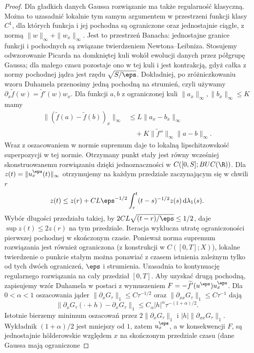\begin{proof}
Dla gładkich danych Gaussa rozwiązanie ma także
regularność klasyczną. Można to uzasadnić lokalnie
tym samym argumentem w przestrzeni funkcji klasy
$C^1$, dla których funkcja i jej pochodna są
ograniczone oraz jednostajnie ciągłe, z normą
$\|w\|_\infty+\|w_x\|_\infty$. Jest to przestrzeń
Banacha: jednostajne granice funkcji i pochodnych
są związane twierdzeniem Newtona--Leibniza.
Stosujemy odwzorowanie Picarda na domkniętej kuli
wokół ewolucji danych przez półgrupę Gaussa;
dla małego czasu pozostaje ono w tej kuli i jest
kontrakcją, gdyż całka z normy pochodnej jądra
jest rzędu $\sqrt{S/\eps}$. Dokładniej, po zróżniczkowaniu wzoru Duhamela
przenosimy jedną pochodną na strumień, czyli używamy
$\partial_x\widetilde f(w)=\widetilde f'(w)w_x$.
Dla funkcji $a,b$ z ograniczonej kuli
$\|a_x\|_\infty,\|b_x\|_\infty\le K$ mamy
\[
 \begin{aligned}
 \|(\widetilde f(a)-\widetilde f(b))_x\|_\infty
 &\le L\|a_x-b_x\|_\infty\\
 &\quad+K\|\widetilde f''\|_\infty\|a-b\|_\infty .
 \end{aligned}
\]
Wraz z oszacowaniem w normie supremum daje to
lokalną lipschitzowskość superpozycji w tej normie.
Otrzymany punkt stały jest równy wcześniej
skonstruowanemu rozwiązaniu dzięki jednoznaczności
w $C([0,S];BUC(\R))$. Dla $z(t)=\|u_x^\eps(t)\|_\infty$
otrzymujemy na każdym przedziale zaczynającym się
w chwili $r$
\[
 z(t)\le z(r)+CL\eps^{-1/2}
 \int_r^t(t-s)^{-1/2}z(s)\,\mathrm d\lambda_1(s).
\]
Wybór długości przedziału takiej, by
$2CL\sqrt{(t-r)/\eps}\le1/2$, daje
$\sup z(t)\le2z(r)$ na tym przedziale.
Iteracja wyklucza utratę ograniczoności pierwszej
pochodnej w skończonym czasie. Ponieważ norma supremum
rozwiązania jest również ograniczona (z konstrukcji
w $C([0,T];X)$), lokalne twierdzenie o punkcie stałym
można ponawiać z czasem istnienia zależnym tylko od
tych dwóch ograniczeń, $\eps$ i strumienia.
Uzasadnia to kontynuację regularnego rozwiązania
na cały przedział $[0,T]$. Aby uzyskać drugą
pochodną, zapisujemy wzór Duhamela w postaci
z wymuszeniem $F=-\widetilde f'(u^\eps)u_x^\eps$.
Dla $0<\alpha<1$ oszacowania jąder
$\|\partial_xG_\tau\|_1\le C\tau^{-1/2}$ oraz
$\|\partial_{xx}G_\tau\|_1\le C\tau^{-1}$ dają
\[
 \|\partial_xG_\tau(\cdot+h)-\partial_xG_\tau\|_1
 \le C_\alpha |h|^\alpha\tau^{-(1+\alpha)/2}.
\]
Istotnie bierzemy minimum oszacowań przez
$2\|\partial_xG_\tau\|_1$ i
$|h|\|\partial_{xx}G_\tau\|_1$.
Wykładnik $(1+\alpha)/2$ jest mniejszy od $1$,
zatem $u_x^\eps$, a w konsekwencji $F$, są
jednostajnie hölderowskie względem $x$ na skończonym
przedziale czasu (dane Gaussa mają ograniczone

\end{proof}
